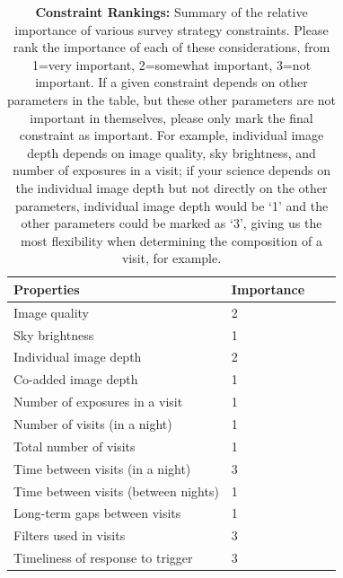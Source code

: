 \documentclass[12pt, letterpaper]{article}
\begin{document}
\begin{table}[ht]
    \centering
    \begin{tabular}{l|l|l|l}
        \toprule
        Properties & Importance \hspace{.3in} \\
        \midrule
        Image quality &  2   \\
        Sky brightness &  1\\
        Individual image depth & 2  \\
        Co-added image depth &  1 \\
        Number of exposures in a visit   & 1  \\
        Number of visits (in a night)  &   1\\ 
        Total number of visits &  1 \\
        Time between visits (in a night) &  3\\
        Time between visits (between nights)  &  1 \\
        Long-term gaps between visits &1 \\
        Filters used in visits & 3 \\
        Timeliness of response to trigger & 3\\
        \bottomrule
    \end{tabular}
    \caption{{\bf Constraint Rankings:} Summary of the relative importance of various survey strategy constraints. Please rank the importance of each of these considerations, from 1=very important, 2=somewhat important, 3=not important. If a given constraint depends on other parameters in the table, but these other parameters are not important in themselves, please only mark the final constraint as important. For example, individual image depth depends on image quality, sky brightness, and number of exposures in a visit; if your science depends on the individual image depth but not directly on the other parameters, individual image depth would be `1' and the other parameters could be marked as `3', giving us the most flexibility when determining the composition of a visit, for example.}
        \label{tab:obs_constraints}
\end{table}
\end{document}
